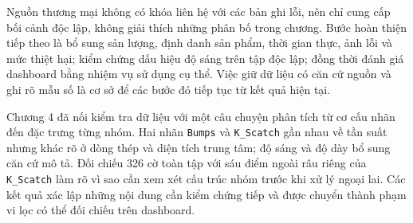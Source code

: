 \documentclass[12pt,a4paper,oneside]{report}
\newcommand{\maCot}[1]{{\urlstyle{tt}\def\UrlBreaks{\do\_\do\/\do\.}\def\UrlBigBreaks{}\nolinkurl{#1}}}
\begin{document}
Nguồn thương mại không có khóa liên hệ với các bản ghi lỗi, nên chỉ cung cấp bối cảnh độc lập, không giải thích những phân bố trong chương. Bước hoàn thiện tiếp theo là bổ sung sản lượng, định danh sản phẩm, thời gian thực, ảnh lỗi và mức thiệt hại; kiểm chứng dấu hiệu độ sáng trên tập độc lập; đồng thời đánh giá dashboard bằng nhiệm vụ sử dụng cụ thể. Việc giữ dữ liệu có căn cứ nguồn và ghi rõ mẫu số là cơ sở để các bước đó tiếp tục từ kết quả hiện tại.

Chương 4 đã nối kiểm tra dữ liệu với một câu chuyện phân tích từ cơ cấu nhãn đến đặc trưng từng nhóm. Hai nhãn \maCot{Bumps} và \maCot{K_Scatch} gần nhau về tần suất nhưng khác rõ ở dòng thép và diện tích trung tâm; độ sáng và độ dày bổ sung căn cứ mô tả. Đối chiếu 326 cờ toàn tập với sáu điểm ngoài râu riêng của \maCot{K_Scatch} làm rõ vì sao cần xem xét cấu trúc nhóm trước khi xử lý ngoại lai. Các kết quả xác lập những nội dung cần kiểm chứng tiếp và được chuyển thành phạm vi lọc có thể đối chiếu trên dashboard.
\end{document}
